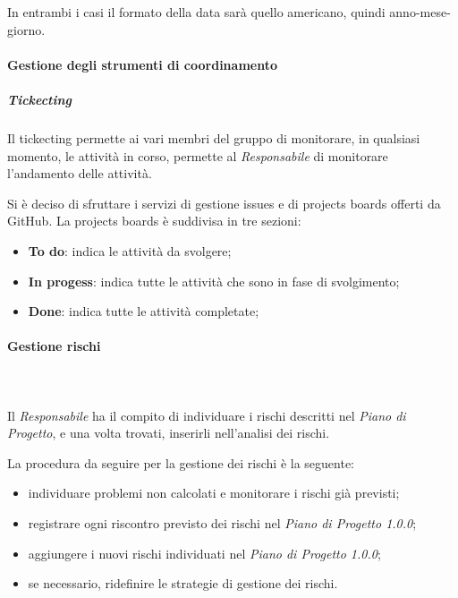    					In entrambi i casi il formato della data sarà quello americano, quindi anno-mese-giorno.
   			\paragraph{Gestione degli strumenti di coordinamento}
   				\subparagraph{Tickecting}
   					Il tickecting permette ai vari membri del gruppo di monitorare, in qualsiasi momento, le attività in corso, permette al \textit{Responsabile} di monitorare l'andamento delle attività.
   					
   					Si è deciso di sfruttare i servizi di gestione issues e di projects boards offerti da GitHub\glos.
   					La projects boards è suddivisa in tre sezioni:
   					\begin{itemize}
   						\item \textbf{To do}: indica le attività da svolgere;
   						\item \textbf{In progess}: indica tutte le attività che sono in fase di svolgimento;
   						\item \textbf{Done}: indica tutte le attività completate;
   					\end{itemize}
   			\paragraph{Gestione rischi}\mbox{}\\ \mbox{}\\
   				Il \textit{Responsabile} ha il compito di individuare i rischi descritti nel \textit{Piano di Progetto}, e una volta trovati, inserirli nell'analisi dei rischi.
   				
   				La procedura da seguire per la gestione dei rischi è la seguente:
   				\begin{itemize}
   					\item individuare problemi non calcolati e monitorare i rischi già previsti;
   					\item registrare ogni riscontro previsto dei rischi nel \textit{Piano di Progetto 1.0.0};
   					\item aggiungere i nuovi rischi individuati nel \textit{Piano di Progetto 1.0.0};
   					\item  se necessario, ridefinire le strategie di gestione dei rischi.
   				\end{itemize}
